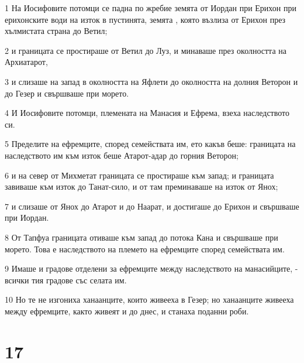\par 1 На Иосифовите потомци се падна по жребие земята от Иордан при Ерихон при ерихонските води на изток в пустинята, земята , която възлиза от Ерихон през хълмистата страна до Ветил;
\par 2 и границата се простираше от Ветил до Луз, и минаваше през околността на Архиатарот,
\par 3 и слизаше на запад в околността на Яфлети до околността на долния Веторон и до Гезер и свършваше при морето.
\par 4 И Иосифовите потомци, племената на Манасия и Ефрема, взеха наследството си.
\par 5 Пределите на ефремците, според семействата им, ето какъв беше: границата на наследството им към изток беше Атарот-адар до горния Веторон;
\par 6 и на север от Михметат границата се простираше към запад; и границата завиваше към изток до Танат-сило, и от там преминаваше на изток от Янох;
\par 7 и слизаше от Янох до Атарот и до Наарат, и достигаше до Ерихон и свършваше при Иордан.
\par 8 От Тапфуа границата отиваше към запад до потока Кана и свършваше при морето. Това е наследството на племето на ефремците според семействата им.
\par 9 Имаше и градове отделени за ефремците между наследството на манасийците, - всички тия градове със селата им.
\par 10 Но те не изгониха ханаанците, които живееха в Гезер; но ханаанците живееха между ефремците, както живеят и до днес, и станаха поданни роби.

\chapter{17}

